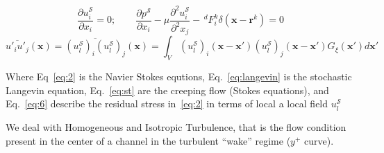 \documentclass[a0paper,portrait]{baposter}
\begin{document}
\begin{poster}
{{\begin{equation}
    \frac{\partial u_i^\mathcal{S}}{\partial x_i} = 0 ; \qquad \frac{\partial p^{\mathcal{S}}}{\partial x_i} - \mu \frac{\partial^2 u_i^{\mathcal{S}}}{\partial^2 x_j} - \, ^d\!F_i^k \delta(\mathbf{x} -\mathbf{r}^k) = 0
    \label{eq:st}
\end{equation}
\begin{equation}
\overline{u'_i u'_j}(\mathbf{x}) = \overline{(u_l^{\mathcal{S}})_i 
(u_l^{\mathcal{S}})_j }(\mathbf{x}) = \int_V (u_l^{\mathcal{S}})_i
(\mathbf{x-x'}) (u_l^{\mathcal{S}})_j (\mathbf{x-x'})G_\xi (\mathbf{x'})d\mathbf{x'}
\label{eq:6}
\end{equation}
\vspace{-0.08in}

Where Eq~\ref{eq:2} is the Navier Stokes equtions, Eq.~\ref{eq:langevin} is the stochastic Langevin equation, Eq.~\ref{eq:st} are the creeping flow (Stokes equations), and Eq.~\ref{eq:6}  describe the residual stress in~\ref{eq:2} in terms of local a local field $u_l^\mathcal{S}$



We deal with Homogeneous and Isotropic Turbulence, that is the flow condition present in the center of a channel in the turbulent ``wake'' regime ($y^+$ curve).
}


}


\end{poster}
\end{document}
